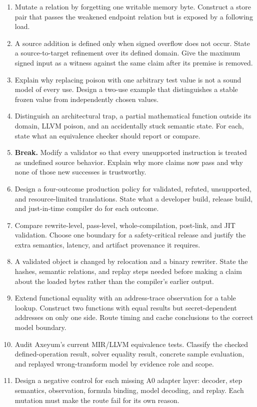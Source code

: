 \begin{enumerate}
\item Mutate a relation by forgetting one writable memory byte. Construct a
store pair that passes the weakened endpoint relation but is exposed by a
following load.

\item A source addition is defined only when signed overflow does not occur.
State a source-to-target refinement over its defined domain. Give the maximum
signed input as a witness against the same claim after its premise is removed.

\item Explain why replacing poison with one arbitrary test value is not a
sound model of every use. Design a two-use example that distinguishes a stable
frozen value from independently chosen values.

\item Distinguish an architectural trap, a partial mathematical function
outside its domain, LLVM poison, and an accidentally stuck semantic state.
For each, state what an equivalence checker should report or compare.

\item \textbf{Break.} Modify a validator so that every unsupported instruction
is treated as undefined source behavior. Explain why more claims now pass and
why none of those new successes is trustworthy.

\item Design a four-outcome production policy for validated, refuted,
unsupported, and resource-limited translations. State what a developer build,
release build, and just-in-time compiler do for each outcome.

\item Compare rewrite-level, pass-level, whole-compilation, post-link, and JIT
validation. Choose one boundary for a safety-critical release and justify the
extra semantics, latency, and artifact provenance it requires.

\item A validated object is changed by relocation and a binary rewriter. State
the hashes, semantic relations, and replay steps needed before making a claim
about the loaded bytes rather than the compiler's earlier output.

\item Extend functional equality with an address-trace observation for a
table lookup. Construct two functions with equal results but secret-dependent
addresses on only one side. Route timing and cache conclusions to the correct
model boundary.

\item Audit Axeyum's current MIR/LLVM equivalence tests. Classify the checked
defined-operation result, solver equality result, concrete sample evaluation,
and replayed wrong-transform model by evidence role and scope.

\item Design a negative control for each missing A0 adapter layer: decoder,
step semantics, observation, formula binding, model decoding, and replay. Each
mutation must make the route fail for its own reason.

\end{enumerate}
